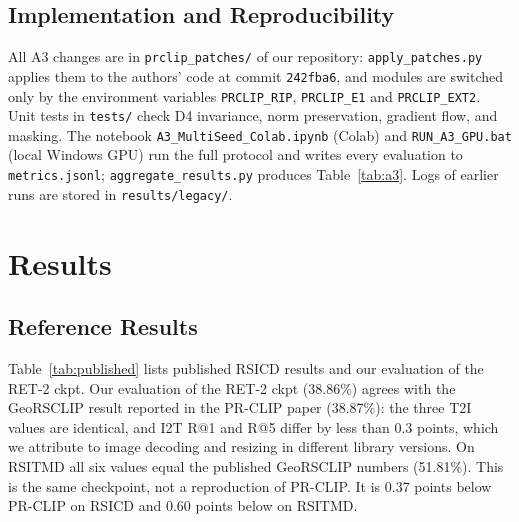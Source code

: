 \documentclass[conference]{IEEEtran}
\begin{document}
\subsection{Implementation and Reproducibility}
All A3 changes are in \texttt{prclip\_patches/} of our repository: \texttt{apply\_patches.py} applies them to the authors' code at commit \texttt{242fba6}, and modules are switched only by the environment variables \texttt{PRCLIP\_RIP}, \texttt{PRCLIP\_E1} and \texttt{PRCLIP\_EXT2}. Unit tests in \texttt{tests/} check D4 invariance, norm preservation, gradient flow, and masking. The notebook \texttt{A3\_MultiSeed\_Colab.ipynb} (Colab) and \texttt{RUN\_A3\_GPU.bat} (local Windows GPU) run the full protocol and writes every evaluation to \texttt{metrics.jsonl}; \texttt{aggregate\_results.py} produces Table~\ref{tab:a3}. Logs of earlier runs are stored in \texttt{results/legacy/}.

\section{Results}

\subsection{Reference Results}
Table~\ref{tab:published} lists published RSICD results and our evaluation of the RET-2 ckpt. Our evaluation of the RET-2 ckpt (38.86\%) agrees with the GeoRSCLIP result reported in the PR-CLIP paper (38.87\%): the three T2I values are identical, and I2T R@1 and R@5 differ by less than 0.3 points, which we attribute to image decoding and resizing in different library versions. On RSITMD all six values equal the published GeoRSCLIP numbers (51.81\%). This is the same checkpoint, not a reproduction of PR-CLIP. It is 0.37 points below PR-CLIP on RSICD and 0.60 points below on RSITMD.
\end{document}
